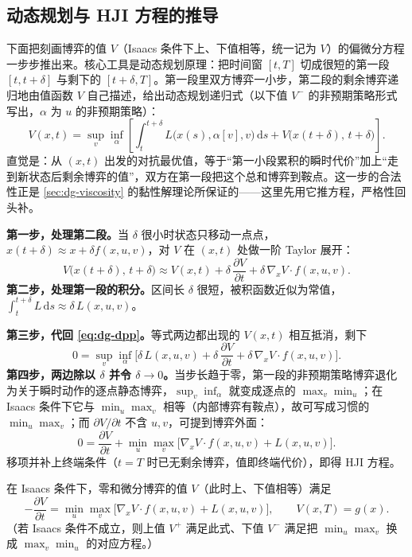 \subsection{动态规划与 HJI 方程的推导}
\label{sec:dg-hji-derive}
下面把刻画博弈的值 $V$（Isaacs 条件下上、下值相等，统一记为 $V$）的偏微分方程一步步推出来。核心工具是动态规划原理：把时间窗 $[t,T]$ 切成很短的第一段 $[t,t+\delta]$ 与剩下的 $[t+\delta,T]$。第一段里双方博弈一小步，第二段的剩余博弈递归地由值函数 $V$ 自己描述，给出动态规划递归式（以下值 $V^-$ 的非预期策略形式写出，$\alpha$ 为 $u$ 的非预期策略）：
\begin{equation}
  V(x,t)=\sup_{v}\inf_{\alpha}\left[\int_t^{t+\delta}L\big(x(s),\alpha[v],v\big)\,\mathrm ds+V\big(x(t+\delta),\,t+\delta\big)\right].
  \label{eq:dg-dpp}
\end{equation}
直觉是：从 $(x,t)$ 出发的对抗最优值，等于“第一小段累积的瞬时代价”加上“走到新状态后剩余博弈的值”，双方在第一段把这个总和博弈到鞍点。这一步的合法性正是 \cref{sec:dg-viscosity} 的黏性解理论所保证的——这里先用它推方程，严格性回头补。

\begin{derivation}
\label{deriv:dg-hji}
\textbf{第一步，处理第二段。}\;当 $\delta$ 很小时状态只移动一点点，$x(t+\delta)\approx x+\delta f(x,u,v)$，对 $V$ 在 $(x,t)$ 处做一阶 Taylor 展开：
\[
  V\big(x(t+\delta),\,t+\delta\big)\approx V(x,t)+\delta\,\frac{\partial V}{\partial t}+\delta\,\nabla_x V\cdot f(x,u,v).
\]
\textbf{第二步，处理第一段的积分。}\;区间长 $\delta$ 很短，被积函数近似为常值，$\int_t^{t+\delta}L\,\mathrm ds\approx\delta\,L(x,u,v)$。

\textbf{第三步，代回 \cref{eq:dg-dpp}。}\;等式两边都出现的 $V(x,t)$ 相互抵消，剩下
\[
  0=\sup_{v}\inf_{\alpha}\Big[\delta\,L(x,u,v)+\delta\,\frac{\partial V}{\partial t}+\delta\,\nabla_x V\cdot f(x,u,v)\Big].
\]
\textbf{第四步，两边除以 $\delta$ 并令 $\delta\to 0$。}\;当步长趋于零，第一段的非预期策略博弈退化为关于瞬时动作的逐点静态博弈，$\sup_v\inf_\alpha$ 就变成逐点的 $\max_v\min_u$；在 Isaacs 条件下它与 $\min_u\max_v$ 相等（内部博弈有鞍点），故可写成习惯的 $\min_u\max_v$；而 $\partial V/\partial t$ 不含 $u,v$，可提到博弈外面：
\[
  0=\frac{\partial V}{\partial t}+\min_u\max_v\Big[\nabla_x V\cdot f(x,u,v)+L(x,u,v)\Big].
\]
移项并补上终端条件（$t=T$ 时已无剩余博弈，值即终端代价），即得 HJI 方程。
\end{derivation}

\begin{theorem}
\label{thm:dg-hji}
在 Isaacs 条件下，零和微分博弈的值 $V$（此时上、下值相等）满足
\begin{equation}
  -\frac{\partial V}{\partial t}=\min_{u}\max_{v}\Big[\nabla_x V\cdot f(x,u,v)+L(x,u,v)\Big],\qquad V(x,T)=g(x).
  \label{eq:dg-hji}
\end{equation}
（若 Isaacs 条件不成立，则上值 $V^+$ 满足此式、下值 $V^-$ 满足把 $\min_u\max_v$ 换成 $\max_v\min_u$ 的对应方程。）
\end{theorem}

